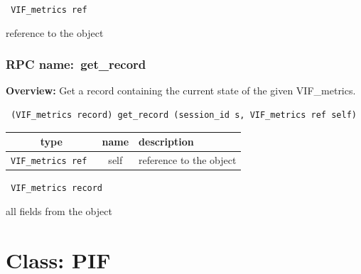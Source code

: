 \vspace{0.3cm}

{\tt 
VIF\_metrics ref
}


reference to the object
\vspace{0.3cm}
\vspace{0.3cm}
\vspace{0.3cm}
\subsubsection{RPC name:~get\_record}

{\bf Overview:} 
Get a record containing the current state of the given VIF\_metrics.

\begin{verbatim} (VIF_metrics record) get_record (session_id s, VIF_metrics ref self)\end{verbatim}



 
\vspace{0.3cm}
\begin{tabular}{|c|c|p{7cm}|}
 \hline
{\bf type} & {\bf name} & {\bf description} \\ \hline
{\tt VIF\_metrics ref } & self & reference to the object \\ \hline 

\end{tabular}

\vspace{0.3cm}

{\tt 
VIF\_metrics record
}


all fields from the object
\vspace{0.3cm}
\vspace{0.3cm}
\vspace{0.3cm}

\vspace{1cm}
\newpage
\section{Class: PIF}
